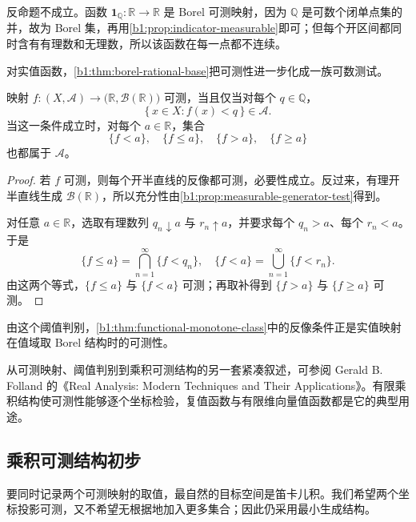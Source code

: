 反命题不成立。函数 \(\mathbf 1_{\mathbb Q}:\mathbb R\to\mathbb R\) 是 Borel 可测映射，因为 \(\mathbb Q\) 是可数个闭单点集的并，故为 Borel 集，再用\cref{b1:prop:indicator-measurable}即可；但每个开区间都同时含有有理数和无理数，所以该函数在每一点都不连续。

\ProseParagraphBreak

对实值函数，\cref{b1:thm:borel-rational-base}把可测性进一步化成一族可数测试。

\begin{proposition}
\label{b1:prop:real-measurable-thresholds}
映射 \(f:(X,\mathcal A)\to\bigl(\mathbb R,\mathcal B(\mathbb R)\bigr)\) 可测，当且仅当对每个 \(q\in\mathbb Q\)，
\[
\{\,x\in X:f(x)<q\,\}\in\mathcal A.
\]
当这一条件成立时，对每个 \(a\in\mathbb R\)，集合
\[
\{f<a\},\quad \{f\leq a\},\quad
\{f>a\},\quad \{f\geq a\}
\]
也都属于 \(\mathcal A\)。
\end{proposition}
\begin{proof}
若 \(f\) 可测，则每个开半直线的反像都可测，必要性成立。反过来，有理开半直线生成 \(\mathcal B(\mathbb R)\)，所以充分性由\cref{b1:prop:measurable-generator-test}得到。

对任意 \(a\in\mathbb R\)，选取有理数列 \(q_n\downarrow a\) 与 \(r_n\uparrow a\)，并要求每个 \(q_n>a\)、每个 \(r_n<a\)。于是
\[
\{f\leq a\}
=\bigcap_{n=1}^{\infty}\{f<q_n\},
\quad
\{f<a\}
=\bigcup_{n=1}^{\infty}\{f<r_n\}.
\]
由这两个等式，\(\{f\leq a\}\) 与 \(\{f<a\}\) 可测；再取补得到 \(\{f>a\}\) 与 \(\{f\geq a\}\) 可测。
\end{proof}

由这个阈值判别，\cref{b1:thm:functional-monotone-class}中的反像条件正是实值映射在值域取 Borel 结构时的可测性。

\ProseParagraphBreak

从可测映射、阈值判别到乘积可测结构的另一套紧凑叙述，可参阅 Gerald B. Folland 的《Real Analysis: Modern Techniques and Their Applications》\cite{Folland1999Real}。有限乘积结构使可测性能够逐个坐标检验，复值函数与有限维向量值函数都是它的典型用途。

\subsection{乘积可测结构初步}
\label{b1:subsec:010404}

要同时记录两个可测映射的取值，最自然的目标空间是笛卡儿积。我们希望两个坐标投影可测，又不希望无根据地加入更多集合；因此仍采用最小生成结构。

